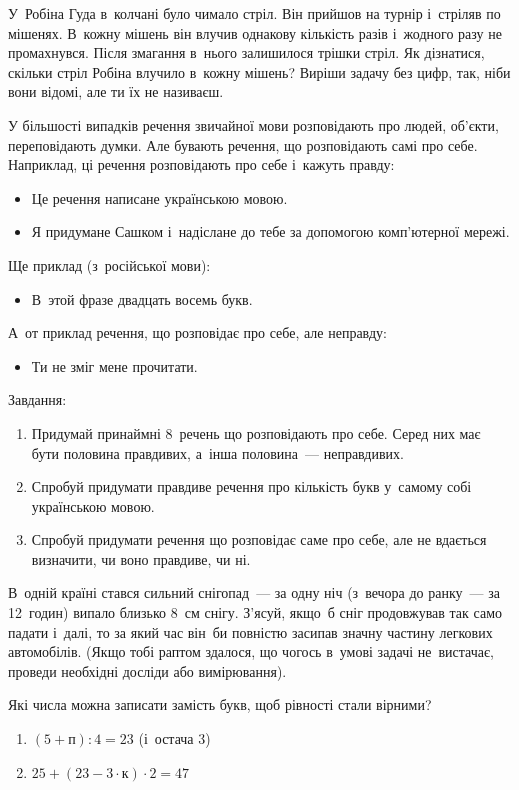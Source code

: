 \problem
{}
У~Робіна Гуда в~колчані було чимало стріл.
Він прийшов на турнір і~стріляв по мішенях.
В~кожну мішень він влучив однакову кількість разів
і~жодного разу не промахнувся.
Після змагання в~нього залишилося трішки стріл.
Як дізнатися, скільки стріл Робіна влучило в~кожну мішень?
Виріши задачу без цифр, так, ніби вони відомі, але ти їх не називаєш.


\problem
У більшості випадків речення звичайної мови розповідають про людей, об'єкти,
переповідають думки.
Але бувають речення, що розповідають самі про себе.
Наприклад, ці речення розповідають про себе і~кажуть правду:
\begin{itemize}
  \item Це речення написане українською мовою.
  \item Я придумане Сашком і~надіслане до тебе
  за допомогою комп’ютерної мережі.
\end{itemize}
Ще приклад (з~російської мови):
\begin{itemize}
  \item В~этой фразе двадцать восемь букв.
\end{itemize}
А~от приклад речення, що розповідає про себе, але неправду:
\begin{itemize}
  \item Ти не зміг мене прочитати.
\end{itemize}
Завдання:
\begin{enumerate}
  \item Придумай принаймні 8~речень що розповідають про себе.
  Серед них має бути половина правдивих, а~інша половина~--- неправдивих.
  \item Спробуй придумати правдиве речення про кількість букв
  у~самому собі українською мовою.
  \item Спробуй придумати речення що розповідає саме про себе,
  але не вдається визначити, чи воно правдиве, чи ні.
\end{enumerate}


\problem
В~одній країні стався сильний снігопад~--- за одну ніч
(з~вечора до ранку~--- за 12~годин) випало близько 8~см снігу.
З'ясуй, якщо~б сніг продовжував так само падати і~далі,
то за який час він~би повністю засипав значну частину легкових автомобілів.
(Якщо тобі раптом здалося, що чогось в~умові задачі не~вистачає,
проведи необхідні досліди або вимірювання).


\problem
Які числа можна записати замість букв, щоб рівності стали вірними?
\begin{enumerate}
  \item $(5 + \textit{п}) : 4 = 23$ (і~остача 3)
  \item $25 + (23 - 3 \cdot \textit{к}) \cdot 2 = 47$
\end{enumerate}


